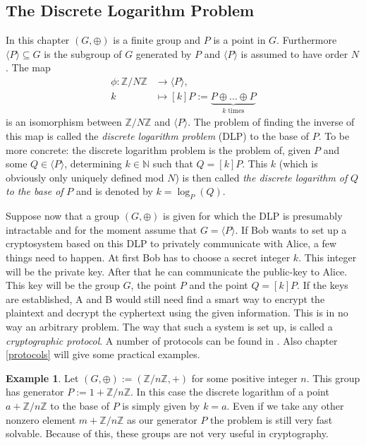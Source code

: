 \documentclass{article}
\numberwithin{equation}{section}
\theoremstyle{definition}
\newtheorem{example}[theorem]{Example}
\newcommand{\NN}{{\mathbb N}} %
\newcommand{\ZZ}{{\mathbb Z}} %
\newcommand{\Zmod}[1]{\ZZ / #1\ZZ} %
\newcommand{\grgen}[1]{\langle #1 \rangle} %
\begin{document}
\subsection{The Discrete Logarithm Problem}\label{DLPsection}
In this chapter $(G,\oplus)$ is a finite group and $P$ is a point in $G$. Furthermore $\grgen{P} \subseteq G$ is the subgroup of $G$ generated by $P$ and $\grgen{P}$ is assumed to have order $N$. The map 
\begin{align*} \phi: \Zmod{N} &\rightarrow \grgen{P}, \\ k &\mapsto [k]P:=\underbrace{P\oplus \ldots \oplus P}_{k \text{ times}}\end{align*} 
is an isomorphism between $\Zmod{N}$ and $\grgen{P}$. The problem of finding the inverse of this map is called the \emph{discrete logarithm problem} (DLP) to the base of $P$. To be more concrete: the discrete logarithm problem is the problem of, given $P$ and some $Q \in \grgen{P}$, determining $k \in \NN$ such that $Q=[k]P$. This $k$ (which is obviously only uniquely defined mod $N$) is then called \emph{the discrete logarithm of} $Q$ \emph{to the base of} $P$ and is denoted by $k=\log_P(Q)$.\par 
Suppose now that a group $(G,\oplus)$ is given for which the DLP is presumably intractable and for the moment assume that $G=\grgen{P}$. If Bob wants to set up a cryptosystem based on this DLP to privately communicate with Alice, a few things need to happen. At first Bob has to choose a secret integer $k$. This integer will be the private key. After that he can communicate the public-key to Alice. This key will be the group $G$, the point $P$ and the point $Q=[k]P$. If the keys are established, A and B would still need find a smart way to encrypt the plaintext and decrypt the cyphertext using the given information. This is in no way an arbitrary problem. The way that such a system is set up, is called a \emph{cryptographic protocol}. A number of protocols can be found in \cite[6]{Washington}. Also chapter \ref{protocols} will give some practical examples.

\begin{example}\label{DLPinF+}
Let $(G,\oplus):=(\Zmod{n},+)$ for some positive integer $n$. This group has generator $P:=1+\Zmod{n}$. In this case the discrete logarithm of a point $a+\Zmod{n}$ to the base of $P$ is simply given by $k=a$. Even if we take any other nonzero element $m+\Zmod{n}$ as our generator $P$ the problem is still very fast solvable. Because of this, these groups are not very useful in cryptography.  
\end{example}
\end{document}
